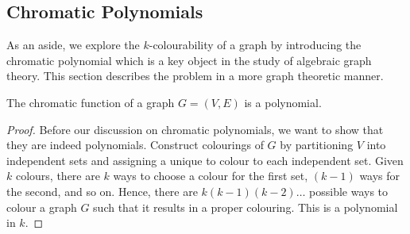 \documentclass[../main.tex]{subfiles}
\begin{document}
    

    \subsection{Chromatic Polynomials}

    As an aside, we explore the $k$-colourability of a graph by introducing the chromatic polynomial which is a key object in the study of algebraic graph theory. This section describes the problem in a more graph theoretic manner. 

    \begin{theorem}
        The chromatic function of a graph $G=(V,E)$ is a polynomial.
    \end{theorem}
    \begin{proof}
        Before our discussion on chromatic polynomials, we want to show that they are indeed polynomials. Construct colourings of $G$ by partitioning $V$ into independent sets and assigning a unique to colour to each independent set. Given $k$ colours, there are $k$ ways to choose a colour for the first set, $(k-1)$ ways for the second, and so on. Hence, there are $k(k-1)(k-2)\dots$ possible ways to colour a graph $G$ such that it results in a proper colouring. This is a polynomial in $k$.
    \end{proof}
\end{document}
